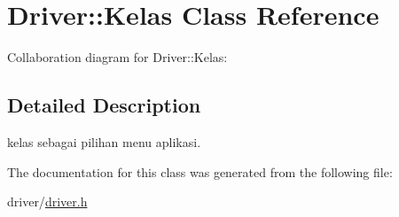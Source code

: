 \hypertarget{classDriver_1_1Kelas}{}\section{Driver\+:\+:Kelas Class Reference}
\label{classDriver_1_1Kelas}


Collaboration diagram for Driver\+:\+:Kelas\+:


\subsection{Detailed Description}
kelas sebagai pilihan menu aplikasi. 

The documentation for this class was generated from the following file\+:\begin{DoxyCompactItemize}
\item 
driver/\hyperlink{driver_8h}{driver.\+h}\end{DoxyCompactItemize}
